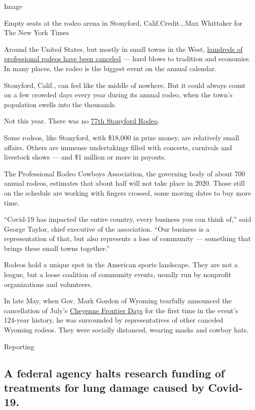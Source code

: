 Image

Empty seats at the rodeo arena in Stonyford, Calif.Credit...Max
Whittaker for The New York Times

Around the United States, but mostly in small towns in the West,
\href{https://www.nytimes3xbfgragh.onion/2020/06/19/us/coronavirus-rodeos.html}{hundreds
of professional rodeos have been canceled} --- hard blows to tradition
and economies. In many places, the rodeo is the biggest event on the
annual calendar.

Stonyford, Calif., can feel like the middle of nowhere. But it could
always count on a few crowded days every year during its annual rodeo,
when the town's population swells into the thousands.

Not this year. There was no
\href{https://www.stonycreekhorsemen.org/}{77th Stonyford Rodeo}.

Some rodeos, like Stonyford, with \$18,000 in prize money, are
relatively small affairs. Others are immense undertakings filled with
concerts, carnivals and livestock shows --- and \$1 million or more in
payouts.

The Professional Rodeo Cowboys Association, the governing body of about
700 annual rodeos, estimates that about half will not take place in
2020. Those still on the schedule are working with fingers crossed, some
moving dates to buy more time.

``Covid-19 has impacted the entire country, every business you can think
of,'' said George Taylor, chief executive of the association. ``Our
business is a representation of that, but also represents a loss of
community --- something that brings these small towns together.''

Rodeos hold a unique spot in the American sports landscape. They are not
a league, but a loose coalition of community events, usually run by
nonprofit organizations and volunteers.

In late May, when Gov. Mark Gordon of Wyoming tearfully announced the
cancellation of July's \href{https://www.cfdrodeo.com/}{Cheyenne
Frontier Days} for the first time in the event's 124-year history, he
was surrounded by representatives of other canceled Wyoming rodeos. They
were socially distanced, wearing masks and cowboy hats.

Reporting

\hypertarget{a-federal-agency-halts-research-funding-of-treatments-for-lung-damage-caused-by-covid-19}{%
\subsection{A federal agency halts research funding of treatments for
lung damage caused by
Covid-19.}\label{a-federal-agency-halts-research-funding-of-treatments-for-lung-damage-caused-by-covid-19}}

